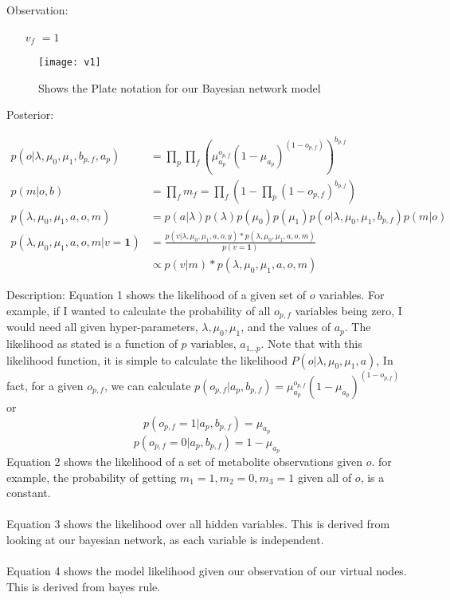\documentclass[11pt]{article}
\begin{document}
Observation:
\begin{itemize}
\item [$v_f$] $ = 1$
\end{itemize}

\begin{figure}
\centering
\texttt{[image: v1]}
\caption{Shows the Plate notation for our Bayesian network model}
\end{figure}

Posterior:

\begin{align}
p(o | \lambda, \mu_0, \mu_1, b_{p,f}, a_p) &= \prod_p \prod_{f} (\mu_{a_p}^{o_{p,f}} (1-\mu_{a_p})^{(1-o_{p,f})})^{b_{p,f}} \\
p(m | o, b) &= \prod_f m_f = \prod_f (1 - \prod_p (1 - o_{p,f})^{b_{p,f}}) \\
p(\lambda, \mu_0, \mu_1, a, o, m) &= p(a | \lambda )p(\lambda) p(\mu_0) p(\mu_1) p( o | \lambda, \mu_0, \mu_1, b_{p,f}) p(m | o) \\
p(\lambda, \mu_0, \mu_1, a, o, m | v = \mathbf{1}) &= \frac{p(v | \lambda, \mu_0, \mu_1, a, o, y) * p(\lambda, \mu_0, \mu_1, a, o, m)}{p(v = \mathbf{1})}  \\
&\propto p(v | m) * p(\lambda, \mu_0, \mu_1, a, o, m) 
\end{align}

Description:
Equation 1 shows the likelihood of a given set of $o$ variables. For example, if I wanted to calculate the probability of all $o_{p,f}$ variables being zero, I would need all given hyper-parameters, $\lambda, \mu_0, \mu_1$, and the values of $a_p$. The likelihood as stated is a function of $p$ variables, $a_{1...p}$. Note that with this likelihood function, it is simple to calculate the likelihood $P(o | \lambda, \mu_0, \mu_1, a)$, In fact, for a given $o_{p,f}$, we can calculate $p(o_{p,f} | a_p, b_{p,f}) = \mu_{a_p}^{o_{p,f}} (1-\mu_{a_p})^{(1-o_{p,f})}$ or 
$$p(o_{p,f} = 1 | a_p, b_{p,f}) = \mu_{a_p}$$
$$p(o_{p,f} = 0 | a_p, b_{p,f}) = 1-\mu_{a_p}$$
Equation 2 shows the likelihood of a set of metabolite observations given $o$. for example, the probability of getting $m_1 = 1, m_2 = 0, m_3 = 1$ given all of $o$, is a constant.\\\\
Equation 3 shows the likelihood over all hidden variables. This is derived from looking at our bayesian network, as each variable is independent.\\\\
Equation 4 shows the model likelihood given our observation of our virtual nodes. This is derived from bayes rule. \\\\
\end{document}
